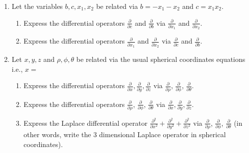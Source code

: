 \begin{enumerate}
\item Let the variables $b,c, x_1, x_2$ be related via $b=-x_1-x_2 $ and $c=x_1 x_2$.
\begin{enumerate}
\item Express the differential operators $\frac{\partial}{\partial c}$ and $\frac{\partial}{\partial b}$ via $\frac{\partial}{\partial x_1}$ and $\frac{\partial}{\partial x_2}$.
\item Express the differential operators  $\frac{\partial}{\partial x_1}$ and $\frac{\partial}{\partial x_2}$ via $\frac{\partial}{\partial c}$ and $\frac{\partial}{\partial b}$. 
\end{enumerate}

\item Let $x,y,z$ and $\rho, \phi,\theta$ be related via the usual spherical coordinates equations i.e., $x= $
\begin{enumerate}
\item Express the differential operators $\frac{\partial }{\partial x}, \frac{\partial }{\partial y}, \frac{\partial}{\partial z}$ via $\frac{\partial }{\partial \rho}$, $\frac{\partial }{\partial \phi}$, $\frac{\partial }{\partial \theta}$.
\item Express the differential operators $\frac{\partial }{\partial \rho}$, $\frac{\partial }{\partial \phi}$, $\frac{\partial }{\partial \theta}$ via $\frac{\partial }{\partial x}, \frac{\partial }{\partial y}, \frac{\partial}{\partial z}$.
\item Express the Laplace differential operator $\frac{\partial^2}{\partial x^2}+\frac{\partial^2}{\partial y^2}+\frac{\partial^2}{\partial z^2}$ via  $\frac{\partial }{\partial \rho}$, $\frac{\partial }{\partial \phi}$, $\frac{\partial }{\partial \theta}$ (in other words, write the 3 dimensional Laplace operator in spherical coordinates).
\end{enumerate}
\end{enumerate}